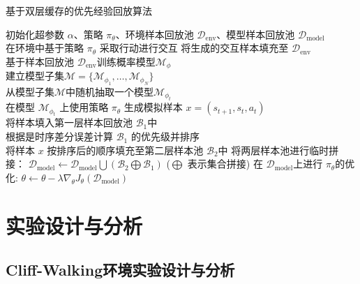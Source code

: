 \begin{algorithm}[t]
\caption{基于双层缓存的优先经验回放算法}
\label{algo:dper-method}
\begin{algorithmic}
\STATE 初始化超参数 $\alpha$、策略 $\pi_\theta$、环境样本回放池 $\mathcal{D}_{\mathrm{env}}$、模型样本回放池 $\mathcal{D}_{\mathrm{model}}$\\
    \STATE 在环境中基于策略 $\pi_\theta$ 采取行动进行交互
    \STATE 将生成的交互样本填充至 $\mathcal{D}_{\mathrm{env}}$\\
        \STATE 基于样本回放池 $\mathcal{D}_{\mathrm{env}}$训练概率模型$\mathcal{M}_\phi$\\
        \STATE 建立模型子集$\mathcal{M} = \{\mathcal{M}_{\phi_1},\ldots,\mathcal{M}_{\phi_{N}}\}$\\
            \STATE 从模型子集$\mathcal{M}$中随机抽取一个模型$\mathcal{M}_{\phi_t}$\\
            \STATE 在模型 $\mathcal{M}_{\phi_t}$ 上使用策略 $\pi_\theta$ 生成模拟样本 $x=\left(s_{t+1},s_t,a_t\right)$ \\
            \STATE 将样本填入第一层样本回放池 $\mathcal{B}_1$中\\
        \ENDFOR
        \STATE 根据是时序差分误差计算 $\mathcal{B}_1$ 的优先级并排序\\
                \STATE 将样本 $x$ 按排序后的顺序填充至第二层样本池 $\mathcal{B}_{2}$中
            \ENDIF
        \ENDFOR
        \STATE 将两层样本池进行临时拼接： $\mathcal{D}_{\mathrm{model}}\leftarrow\mathcal{D}_{\mathrm{model}}\bigcup(\mathcal{B}_2\bigoplus\mathcal{B}_1)$ ($\bigoplus$ 表示集合拼接)
    \ENDFOR
    \STATE 在 $\mathcal{D}_{\mathrm{model}}$上进行 $\pi_\theta$的优化: $\theta\leftarrow \theta - \lambda\nabla_\theta J_\theta(\mathcal{D}_{\mathrm{model}})$
\ENDFOR
\end{algorithmic}
\end{algorithm}

\section{实验设计与分析}

\subsection{Cliff-Walking环境实验设计与分析}

